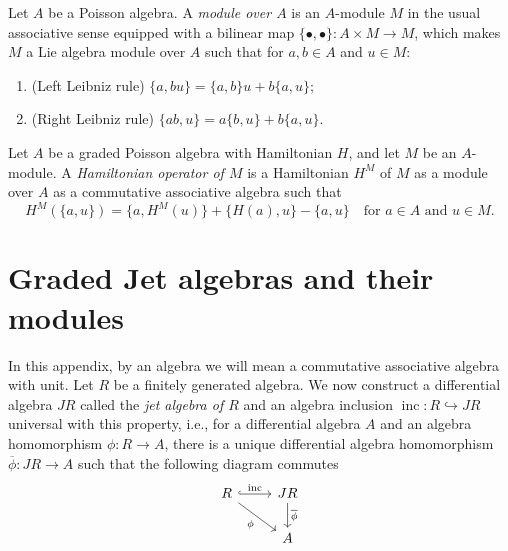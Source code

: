 \documentclass[a4paper, 12pt, reqno]{amsart}
\theoremstyle{remark}
\DeclareMathOperator{\inc}{inc}
\begin{document}
Let $A$ be a Poisson algebra.
A \emph{module over $A$} is an $A$-module $M$ in the usual associative sense equipped with a bilinear map $\{\bullet, \bullet\}: A \times M \to M$, which makes $M$ a Lie algebra module over $A$ such that for $a, b \in A$ and $u \in M$:
\begin{enumerate}
\item (Left Leibniz rule) $\{a, bu\} = \{a, b\}u + b\{a, u\}$;
\item (Right Leibniz rule) $\{ab, u\} = a\{b, u\} + b\{a, u\}$.
\end{enumerate}

Let $A$ be a graded Poisson algebra with Hamiltonian $H$, and let $M$ be an $A$-module.
A \emph{Hamiltonian operator of $M$} is a Hamiltonian $H^M$ of $M$ as a module over $A$ as a commutative associative algebra such that
\begin{equation*}
  H^M(\{a, u\}) = \{a, H^M(u)\} + \{H(a), u\} - \{a, u\} \quad \text{for $a \in A$ and $u \in M$}.
\end{equation*}

\section{Graded Jet algebras and their modules}
\label{sec:graded-jet-algebras}

In this appendix, by an algebra we will mean a commutative associative algebra with unit.
Let $R$ be a finitely generated algebra.
We now construct a differential algebra $JR$ called the \emph{jet algebra of $R$} and an algebra inclusion $\inc: R \hookrightarrow JR$ universal with this property, i.e., for a differential algebra $A$ and an algebra homomorphism $\phi: R \to A$, there is a unique differential algebra homomorphism $\overline{\phi}: JR \to A$ such that the following diagram commutes
\begin{equation*}
  \begin{tikzcd}
    R \arrow[r, "\inc", hook] \arrow[rd, "\phi"'] & JR \arrow[d, "\overline{\phi}"] \\
    & A
  \end{tikzcd}
\end{equation*}
\end{document}
